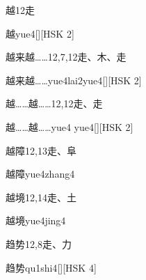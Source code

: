 \begin{entry}{越}{12}{⾛}
  \begin{phonetics}{越}{yue4}[][HSK 2]
  \end{phonetics}
\end{entry}

\begin{entry}{越来越……}{12,7,12}{⾛、⽊、⾛}
  \begin{phonetics}{越来越……}{yue4lai2yue4}[][HSK 2]
  \end{phonetics}
\end{entry}

\begin{entry}{越……越……}{12,12}{⾛、⾛}
  \begin{phonetics}{越……越……}{yue4 yue4}[][HSK 2]
  \end{phonetics}
\end{entry}

\begin{entry}{越障}{12,13}{⾛、⾩}
  \begin{phonetics}{越障}{yue4zhang4}
  \end{phonetics}
\end{entry}

\begin{entry}{越境}{12,14}{⾛、⼟}
  \begin{phonetics}{越境}{yue4jing4}
  \end{phonetics}
\end{entry}

\begin{entry}{趋势}{12,8}{⾛、⼒}
  \begin{phonetics}{趋势}{qu1shi4}[][HSK 4]
  \end{phonetics}
\end{entry}


